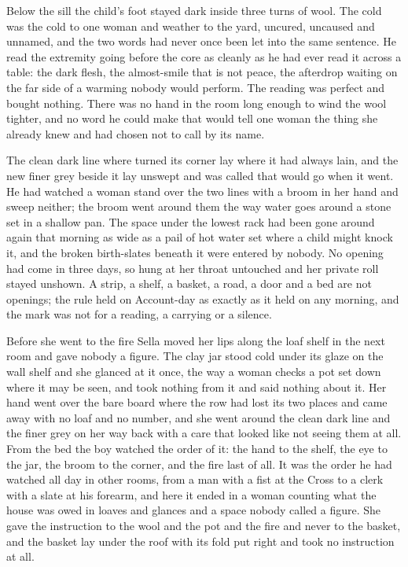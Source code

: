 Below the sill the child's foot stayed dark inside three turns of wool. The cold was the cold to one woman and weather to the yard, uncured, uncaused and unnamed, and the two words had never once been let into the same sentence. He read the extremity going before the core as cleanly as he had ever read it across a table: the dark flesh, the almost-smile that is not peace, the afterdrop waiting on the far side of a warming nobody would perform. The reading was perfect and bought nothing. There was no hand in the room long enough to wind the wool tighter, and no word he could make that would tell one woman the thing she already knew and had chosen not to call by its name.

The clean dark line where  turned its corner lay where it had always lain, and the new finer grey beside it lay unswept and was called  that would go when it went. He had watched a woman stand over the two lines with a broom in her hand and sweep neither; the broom went around them the way water goes around a stone set in a shallow pan. The space under the lowest rack had been gone around again that morning as wide as a pail of hot water set where a child might knock it, and the broken birth-slates beneath it were entered by nobody. No opening had come in three days, so  hung at her throat untouched and her private roll stayed unshown. A strip, a shelf, a basket, a road, a door and a bed are not openings; the rule held on Account-day as exactly as it held on any morning, and the mark was not for a reading, a carrying or a silence.

Before she went to the fire Sella moved her lips along the loaf shelf in the next room and gave nobody a figure. The clay jar stood cold under its glaze on the wall shelf and she glanced at it once, the way a woman checks a pot set down where it may be seen, and took nothing from it and said nothing about it. Her hand went over the bare board where the row had lost its two places and came away with no loaf and no number, and she went around the clean dark line and the finer grey on her way back with a care that looked like not seeing them at all. From the bed the boy watched the order of it: the hand to the shelf, the eye to the jar, the broom to the corner, and the fire last of all. It was the order he had watched all day in other rooms, from a man with a fist at the Cross to a clerk with a slate at his forearm, and here it ended in a woman counting what the house was owed in loaves and glances and a space nobody called a figure. She gave the instruction to the wool and the pot and the fire and never to the basket, and the basket lay under the roof with its fold put right and took no instruction at all.

